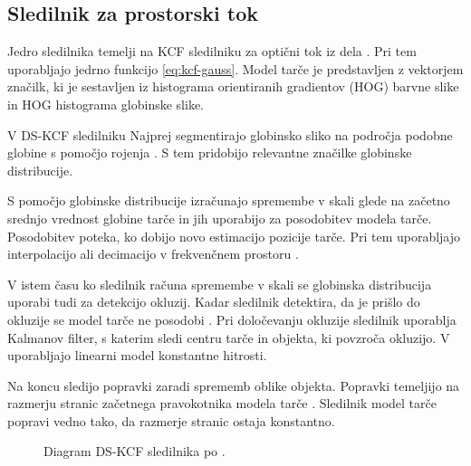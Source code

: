 \subsection{Sledilnik za prostorski tok}
Jedro sledilnika temelji na KCF sledilniku za optični tok iz dela \cite{henriques2015high}. Pri tem uporabljajo jedrno funkcijo \eqref{eq:kcf-gauss}. Model tarče je predstavljen z vektorjem značilk, ki je sestavljen iz histograma orientiranih gradientov (HOG) barvne slike in HOG histograma globinske slike. 

V DS-KCF sledilniku Najprej segmentirajo globinsko sliko na področja podobne globine s pomočjo rojenja \cite{hannuna2016ds}. S tem pridobijo relevantne značilke globinske distribucije. 

S pomočjo globinske distribucije izračunajo spremembe v skali glede na začetno srednjo vrednost globine tarče in jih uporabijo za posodobitev modela tarče. Posodobitev poteka, ko dobijo novo estimacijo pozicije tarče. Pri tem uporabljajo interpolacijo ali decimacijo v frekvenčnem prostoru \cite{hannuna2016ds}.

V istem času ko sledilnik računa spremembe v skali se globinska distribucija uporabi tudi za detekcijo okluzij. Kadar sledilnik detektira, da je prišlo do okluzije se model tarče ne posodobi \cite{hannuna2016ds}. Pri določevanju okluzije sledilnik uporablja Kalmanov filter, s katerim sledi centru tarče in objekta, ki povzroča okluzijo. V \cite{hannuna2016ds} uporabljajo linearni model konstantne hitrosti.  

Na koncu sledijo popravki zaradi sprememb oblike objekta. Popravki temeljijo na razmerju stranic začetnega pravokotnika modela tarče \cite{hannuna2016ds}. Sledilnik model tarče popravi vedno tako, da razmerje stranic ostaja konstantno.




\begin{figure}[htb]
\centering

\caption{Diagram DS-KCF sledilnika po \cite{hannuna2016ds}.}
\label{fig:diagram-dskcf}
\end{figure}
